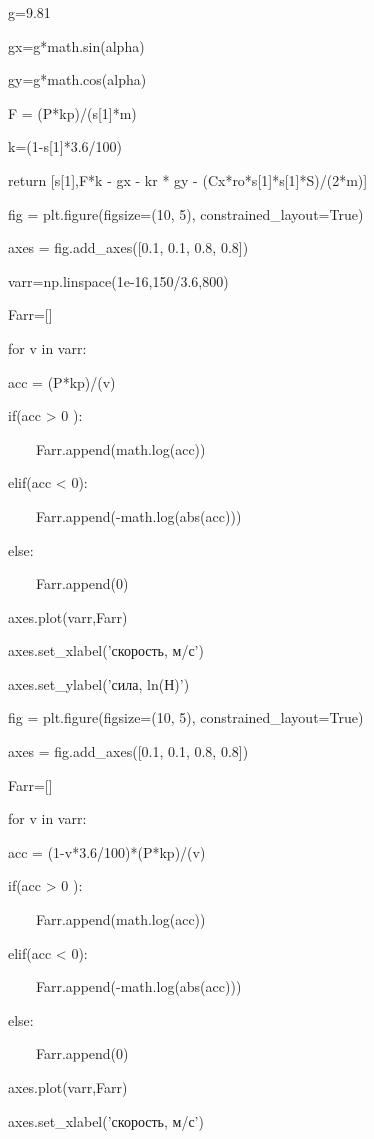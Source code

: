 \documentclass[A4paper,12pt]{article}
\theoremstyle{plain} %
\theoremstyle{definition} %
\theoremstyle{remark} %
\begin{document}
    g=9.81
    
    gx=g*math.sin(alpha)
    
    gy=g*math.cos(alpha)
    


    F = (P*kp)/(s[1]*m)
    
    k=(1-s[1]*3.6/100)
    
    return [s[1],F*k - gx - kr * gy - (Cx*ro*s[1]*s[1]*S)/(2*m)]

\noindent fig = plt.figure(figsize=(10, 5), constrained\_layout=True)

\noindent axes = fig.add\_axes([0.1, 0.1, 0.8, 0.8])

\noindent varr=np.linspace(1e-16,150/3.6,800)

\noindent Farr=[]

\noindent for v in varr:

    acc = (P*kp)/(v)

    if(acc > 0 ):
    
    \ \ \ \ Farr.append(math.log(acc))
        
    elif(acc < 0):
    
    \ \ \ \ Farr.append(-math.log(abs(acc)))
        
    else:
    
    \ \ \ \ Farr.append(0)
        
\noindent axes.plot(varr,Farr)

\noindent axes.set\_xlabel('скорость, м/с')

\noindent axes.set\_ylabel('сила, ln(Н)')

\noindent fig = plt.figure(figsize=(10, 5), constrained\_layout=True)

\noindent axes = fig.add\_axes([0.1, 0.1, 0.8, 0.8])

\noindent Farr=[]

\noindent for v in varr:

    acc = (1-v*3.6/100)*(P*kp)/(v)

    if(acc > 0 ):
    
    \ \ \ \ Farr.append(math.log(acc))
        
    elif(acc < 0):
    
    \ \ \ \ Farr.append(-math.log(abs(acc)))
        
    else:
    
    \ \ \ \ Farr.append(0)
        
\noindent axes.plot(varr,Farr)

\noindent axes.set\_xlabel('скорость, м/с')
\end{document}
